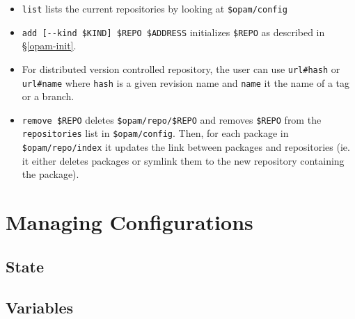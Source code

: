 \documentclass[a4paper,10pt]{article}
\begin{document}
\begin{itemize}
\item \verb+list+ lists the current repositories by looking at
  \verb+$opam/config+

\item \verb+add [--kind $KIND] $REPO $ADDRESS+ initializes
  \verb+$REPO+ as described in \S\ref{opam-init}.

\item For distributed version controlled repository, the user can use
  \verb+url#hash+ or \verb+url#name+ where {\tt hash} is a given
  revision name and {\tt name} it the name of a tag or a branch.

\item \verb+remove $REPO+ deletes \verb+$opam/repo/$REPO+ and removes
  \verb+$REPO+ from the {\tt repositories} list in \verb+$opam/config+.
  Then, for each package in \verb+$opam/repo/index+ it updates the link
  between packages and repositories (ie. it either deletes packages or
  symlink them to the new repository containing the package).

\end{itemize}

\section{Managing Configurations}
\label{section:config}

\subsection{State}

\subsection{Variables}
\label{subsection:variables}
\end{document}
